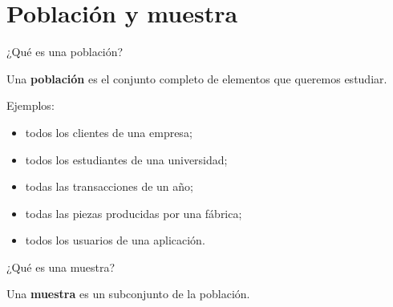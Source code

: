 \documentclass[aspectratio=169,11pt]{beamer}
\begin{document}
\section{Población y muestra}

\begin{frame}{¿Qué es una población?}

Una \textbf{población} es el conjunto completo de elementos que queremos estudiar.

Ejemplos:

\begin{itemize}

    \item todos los clientes de una empresa;

    \item todos los estudiantes de una universidad;

    \item todas las transacciones de un año;

    \item todas las piezas producidas por una fábrica;

    \item todos los usuarios de una aplicación.

\end{itemize}

\end{frame}


\begin{frame}{¿Qué es una muestra?}

Una \textbf{muestra} es un subconjunto de la población.

\vspace{0.3cm}

\begin{center}


\end{center}

\end{frame}
\end{document}
